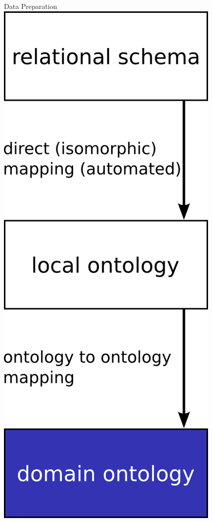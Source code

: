 \documentclass{beamer}
\begin{document}
\begin{frame}{Data Preparation}
\includegraphics[width=\textwidth,height=.88\textheight,keepaspectratio]{g3}
\end{frame}
\end{document}
